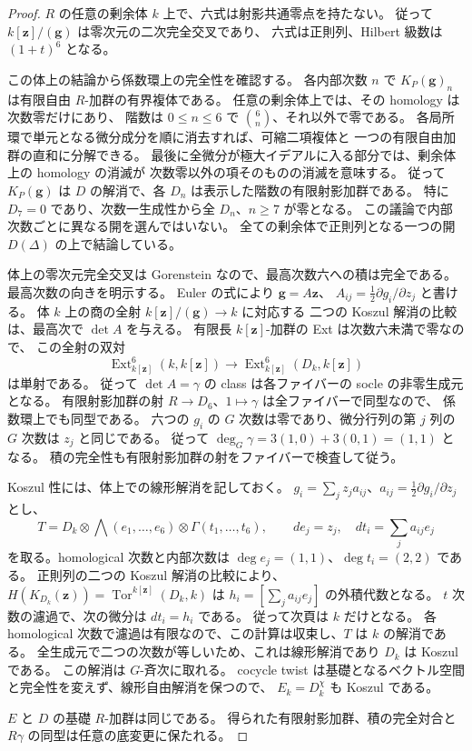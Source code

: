 \begin{proof}
$R$ の任意の剰余体 $k$ 上で、六式は射影共通零点を持たない。
従って $k[\mathbf z]/(\mathbf g)$ は零次元の二次完全交叉であり、
六式は正則列、Hilbert 級数は $(1+t)^6$ となる。

この体上の結論から係数環上の完全性を確認する。
各内部次数 $n$ で $K_P(\mathbf g)_n$ は有限自由 $R$-加群の有界複体である。
任意の剰余体上では、その homology は次数零だけにあり、
階数は $0\le n\le6$ で $\binom6n$、それ以外で零である。
各局所環で単元となる微分成分を順に消去すれば、可縮二項複体と
一つの有限自由加群の直和に分解できる。
最後に全微分が極大イデアルに入る部分では、剰余体上の homology の消滅が
次数零以外の項そのものの消滅を意味する。
従って $K_P(\mathbf g)$ は $D$ の解消で、各 $D_n$ は表示した階数の有限射影加群である。
特に $D_7=0$ であり、次数一生成性から全 $D_n$、$n\ge7$ が零となる。
この議論で内部次数ごとに異なる開を選んではいない。
全ての剰余体で正則列となる一つの開 $D(\Delta)$ の上で結論している。

体上の零次元完全交叉は Gorenstein なので、最高次数六への積は完全である。
最高次数の向きを明示する。
Euler の式により $\mathbf g=A\mathbf z$、
$A_{ij}=\tfrac12\partial g_i/\partial z_j$ と書ける。
体 $k$ 上の商の全射 $k[\mathbf z]/(\mathbf g)\to k$ に対応する
二つの Koszul 解消の比較は、最高次で $\det A$ を与える。
有限長 $k[\mathbf z]$-加群の Ext は次数六未満で零なので、
この全射の双対
\[
 \operatorname{Ext}^6_{k[\mathbf z]}(k,k[\mathbf z])
   \longrightarrow
 \operatorname{Ext}^6_{k[\mathbf z]}(D_k,k[\mathbf z])
\]
は単射である。
従って $\det A=\gamma$ の class は各ファイバーの socle の非零生成元となる。
有限射影加群の射 $R\to D_6$、$1\mapsto\gamma$ は全ファイバーで同型なので、
係数環上でも同型である。
六つの $g_i$ の $G$ 次数は零であり、微分行列の第 $j$ 列の $G$ 次数は $z_j$ と同じである。
従って $\deg_G\gamma=3(1,0)+3(0,1)=(1,1)$ となる。
積の完全性も有限射影加群の射をファイバーで検査して従う。

Koszul 性には、体上での線形解消を記しておく。
$g_i=\sum_j z_j a_{ij}$、$a_{ij}=\tfrac12\partial g_i/\partial z_j$ とし、
\[
 T=D_k\otimes\bigwedge(e_1,\ldots,e_6)
                \otimes\Gamma(t_1,\ldots,t_6),\qquad
 de_j=z_j,\quad dt_i=\sum_j a_{ij}e_j
\]
を取る。homological 次数と内部次数は $\deg e_j=(1,1)$、$\deg t_i=(2,2)$ である。
正則列の二つの Koszul 解消の比較により、
$H(K_{D_k}(\mathbf z))=\operatorname{Tor}^{k[\mathbf z]}(D_k,k)$ は
$h_i=[\sum_j a_{ij}e_j]$ の外積代数となる。
$t$ 次数の濾過で、次の微分は $dt_i=h_i$ である。
従って次頁は $k$ だけとなる。
各 homological 次数で濾過は有限なので、この計算は収束し、$T$ は $k$ の解消である。
全生成元で二つの次数が等しいため、これは線形解消であり $D_k$ は Koszul である。
この解消は $G$-斉次に取れる。
cocycle twist は基礎となるベクトル空間と完全性を変えず、線形自由解消を保つので、
$E_k=D_k^\chi$ も Koszul である。

$E$ と $D$ の基礎 $R$-加群は同じである。
得られた有限射影加群、積の完全対合と $R\gamma$ の同型は任意の底変更に保たれる。
\end{proof}


